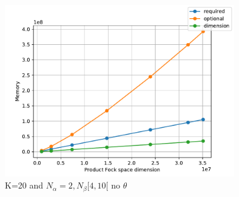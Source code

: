 \begin{center}
\begin{figure}
  \centering
  \includegraphics[width=10cm]{graphs/K=20_neq_dumb_low.pdf}
  \caption{K=20 and $N_\alpha = 2, N_\beta [4,10[$ no $\theta$}
  \label{}
\end{figure}

\end{center}
